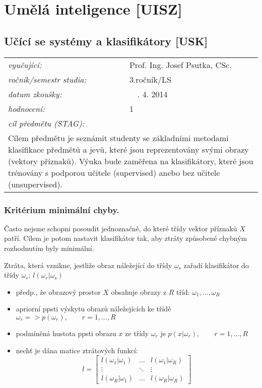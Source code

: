 \chapter{Umělá inteligence [UISZ]}

\section{Učící se systémy a klasifikátory [USK]}

\begin{table}[H]
\centering
\begin{tabular}{p{4cm} p{12cm}}
\textit{vyučující:}             & Prof. Ing. Josef Psutka, CSc. \\
\textit{ročník/semestr studia:} & 3.ročník/LS \\
\textit{datum zkoušky:}         & $\quad $. 4. 2014 \\
\textit{hodnocení:}             & 1 \\
\textit{cíl předmětu (STAG):}   & \\
\multicolumn{2}{p{16cm}}{Cílem předmětu je seznámit studenty se základními metodami klasifikace předmětů a jevů, které jsou reprezentovány svými obrazy (vektory příznaků). Výuka bude zaměřena na klasifikátory, které jsou trénovány s podporou učitele (supervised) anebo bez učitele (unsupervised).}
\end{tabular}
\end{table}

\subsection{Kritérium minimální chyby.}
Často nejsme schopni posoudit jednoznačně, do které třídy vektor příznaků $ X $ patří. Cílem je potom nastavit klasifikátor tak, aby ztráty způsobené chybným rozhodnutím byly minimální.

\begin{definition}
Ztráta, která vznikne, jestliže obraz náležející do třídy $ \omega_s $ zařadí klasifikátor do třídy $ \omega_r $: $ l(\omega_r | \omega_s) $
\end{definition}

\begin{itemize}
\item předp., že obrazový prostor $ X $ obsahuje obrazy z $ R $ tříd: $ \omega_1, ..., \omega_R $
\item apriorní ppsti výskytu obrazů náležejících ke třídě $ \omega_r => p(\omega_r), \qquad r = 1,...,R $
\item podmíněná hustota ppsti obrazu $ x $ ze třídy $ \omega_r $ je $ p(x | \omega_r), \qquad r = 1,...,R $
\item nechť je dána matice ztrátových funkcí:
\begin{equation}
l = \begin{bmatrix} l(\omega_1 | \omega_1) & \dots & l(\omega_1 | \omega_R) \\  
\vdots & \ddots & \vdots \\
l(\omega_R | \omega_1) & \dots & l(\omega_R | \omega_R) \end{bmatrix}
\end{equation}
\end{itemize}

